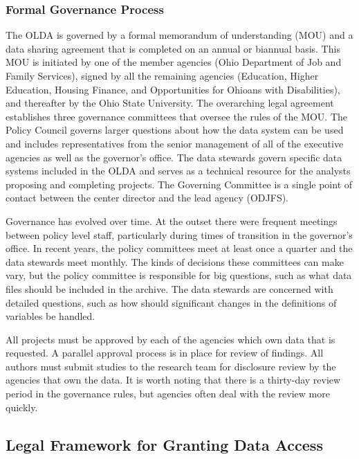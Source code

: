 \documentclass[
]{book}
\begin{document}
\hypertarget{formal-governance-process}{%
\subsubsection*{Formal Governance Process}\label{formal-governance-process}}

The OLDA is governed by a formal memorandum of understanding (MOU) and a data sharing agreement that is completed on an annual or biannual basis. This MOU is initiated by one of the member agencies (Ohio Department of Job and Family Services), signed by all the remaining agencies (Education, Higher Education, Housing Finance, and Opportunities for Ohioans with Disabilities), and thereafter by the Ohio State University. The overarching legal agreement establishes three governance committees that oversee the rules of the MOU. The Policy Council governs larger questions about how the data system can be used and includes representatives from the senior management of all of the executive agencies as well as the governor's office. The data stewards govern specific data systems included in the OLDA and serves as a technical resource for the analysts proposing and completing projects. The Governing Committee is a single point of contact between the center director and the lead agency (ODJFS).

Governance has evolved over time. At the outset there were frequent meetings between policy level staff, particularly during times of transition in the governor's office. In recent years, the policy committees meet at least once a quarter and the data stewards meet monthly. The kinds of decisions these committees can make vary, but the policy committee is responsible for big questions, such as what data files should be included in the archive. The data stewards are concerned with detailed questions, such as how should significant changes in the definitions of variables be handled.

All projects must be approved by each of the agencies which own data that is requested. A parallel approval process is in place for review of findings. All authors must submit studies to the research team for disclosure review by the agencies that own the data. It is worth noting that there is a thirty-day review period in the governance rules, but agencies often deal with the review more quickly.

\hypertarget{legal-framework-for-granting-data-access-1}{%
\subsection{Legal Framework for Granting Data Access}\label{legal-framework-for-granting-data-access-1}}
\end{document}

